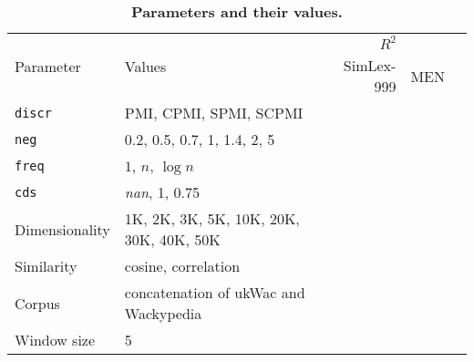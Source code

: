 \begin{table*}[h]
  \centering
  \begin{tabular}{llrrr}
    \toprule
    \multirow{2}{*}{Parameter} & \multirow{2}{*}{Values} &
    \multicolumn{2}{c}{$R^2$} \\
    \cmidrule(r){3-4}
    & & SimLex-999 & MEN \\
    \midrule
    \texttt{discr} & PMI, CPMI, SPMI, SCPMI \\
    \texttt{neg} & 0.2, 0.5, 0.7, 1, 1.4, 2, 5 \\
    \texttt{freq} & $1$, $n$, $\log n$ \\
    \texttt{cds} & \textit{nan}, 1, 0.75 \\
    Dimensionality & 1K, 2K, 3K, 5K, 10K, 20K, 30K, 40K, 50K \\
    Similarity & cosine, correlation \\
    Corpus & concatenation of ukWac and Wackypedia \\
    Window size & 5 \\
    \bottomrule
  \end{tabular}
  \caption{\textbf{Parameters and their values.}}
\label{tab:parameters}
\end{table*}

